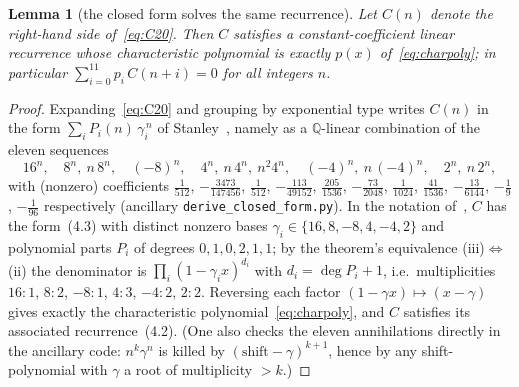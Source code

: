 \documentclass[11pt]{article}
\newtheorem{lemma}[theorem]{Lemma}
\theoremstyle{definition}
\begin{document}
\begin{lemma}[the closed form solves the same recurrence]\label{lem:c20}
Let $C(n)$ denote the right-hand side of~\eqref{eq:C20}. Then $C$ satisfies a
constant-coefficient linear recurrence whose characteristic polynomial is exactly $p(x)$
of~\eqref{eq:charpoly}; in particular $\sum_{i=0}^{11}p_i\,C(n+i)=0$ for all integers $n$.
\end{lemma}

\begin{proof}
Expanding~\eqref{eq:C20} and grouping by exponential type writes $C(n)$ in the form
$\sum_i P_i(n)\,\gamma_i^{\,n}$ of Stanley~\cite[Thm.~4.1.1(iii)]{EC1}, namely as a
$\mathbb Q$-linear combination of the eleven sequences
\[
  16^n,\quad 8^n,\ n\,8^n,\quad (-8)^n,\quad 4^n,\ n\,4^n,\ n^2 4^n,\quad
  (-4)^n,\ n\,(-4)^n,\quad 2^n,\ n\,2^n,
\]
with (nonzero) coefficients
$\tfrac{1}{512}$, $-\tfrac{3473}{147456}$, $\tfrac{1}{512}$, $-\tfrac{113}{49152}$,
$\tfrac{205}{1536}$, $-\tfrac{73}{2048}$, $\tfrac{1}{1024}$, $\tfrac{41}{1536}$,
$-\tfrac{13}{6144}$, $-\tfrac{1}{9}$, $-\tfrac{1}{96}$ respectively (ancillary
\texttt{derive\_closed\_form.py}). In the notation of~\cite[Thm.~4.1.1]{EC1}, $C$ has the
form~(4.3) with distinct nonzero bases $\gamma_i\in\{16,8,-8,4,-4,2\}$ and polynomial parts
$P_i$ of degrees $0,1,0,2,1,1$; by the theorem's equivalence (iii)$\Leftrightarrow$(ii) the
denominator is $\prod_i(1-\gamma_i x)^{d_i}$ with $d_i=\deg P_i+1$, i.e.\ multiplicities
$16:1$, $8:2$, $-8:1$, $4:3$, $-4:2$, $2:2$. Reversing each factor
$(1-\gamma x)\mapsto(x-\gamma)$ gives exactly the characteristic
polynomial~\eqref{eq:charpoly}, and $C$ satisfies its associated recurrence~(4.2). (One also
checks the eleven annihilations directly in the ancillary code: $n^k\gamma^n$ is killed by
$(\text{shift}-\gamma)^{k+1}$, hence by any shift-polynomial with $\gamma$ a root of
multiplicity $>k$.)
\end{proof}
\end{document}
